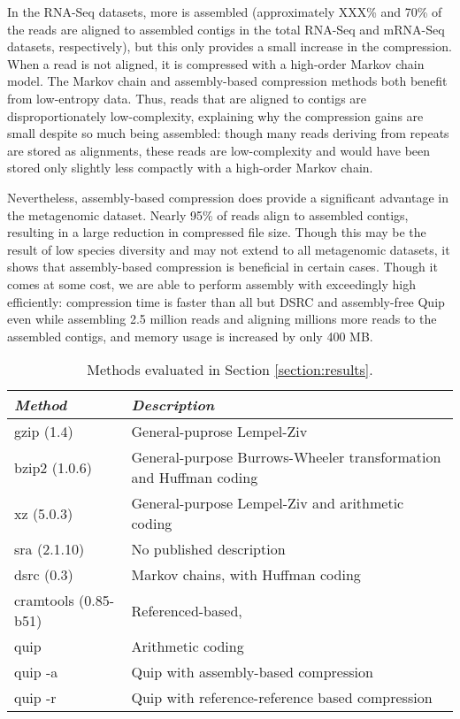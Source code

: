 \documentclass[twocolumn]{article}
\begin{document}
In the RNA-Seq datasets, more is assembled (approximately XXX\% and 70\% of
the reads are aligned to assembled contigs in the total RNA-Seq and mRNA-Seq
datasets, respectively), but this only provides a small increase in the
compression. When a read is not aligned, it is compressed with a high-order
Markov chain model. The Markov chain and assembly-based compression methods
both benefit from low-entropy data. Thus, reads that are aligned to contigs
are disproportionately low-complexity, explaining why the compression gains
are small despite so much being assembled: though many reads deriving from
repeats are stored as alignments, these reads are low-complexity and would
have been stored only slightly less compactly with a high-order Markov chain.

Nevertheless, assembly-based compression does provide a significant advantage
in the metagenomic dataset. Nearly 95\% of reads align to assembled contigs,
resulting in a large reduction in compressed file size. Though this may be the
result of low species diversity and may not extend to all metagenomic
datasets, it shows that assembly-based compression is beneficial in certain
cases. Though it comes at some cost, we are able to perform assembly with
exceedingly  high efficiently: compression time is faster than all but DSRC
and assembly-free Quip even while assembling 2.5 million reads and aligning
millions more reads to the assembled contigs, and memory usage is increased by
only 400 MB.


\begin{table}
\begin{tabular}{lp{}}
\textit{Method} & \textit{Description} \\ \hline
gzip (1.4)      & General-puprose Lempel-Ziv \\
bzip2 (1.0.6)   &
General-purpose Burrows-Wheeler transformation and Huffman coding \\
xz  (5.0.3)     &
General-purpose Lempel-Ziv and arithmetic coding \\
sra (2.1.10)           & No published description \\
dsrc (0.3) & Markov chains,  with Huffman coding \\
cramtools (0.85-b51)  & Referenced-based, \\
quip            & Arithmetic coding \\
quip -a         & Quip with assembly-based compression \\
quip -r         &
Quip with reference-reference based compression \\
\end{tabular}
\caption{Methods evaluated in Section \ref{section:results}.}
\label{tab:methods}
\end{table}
\end{document}
